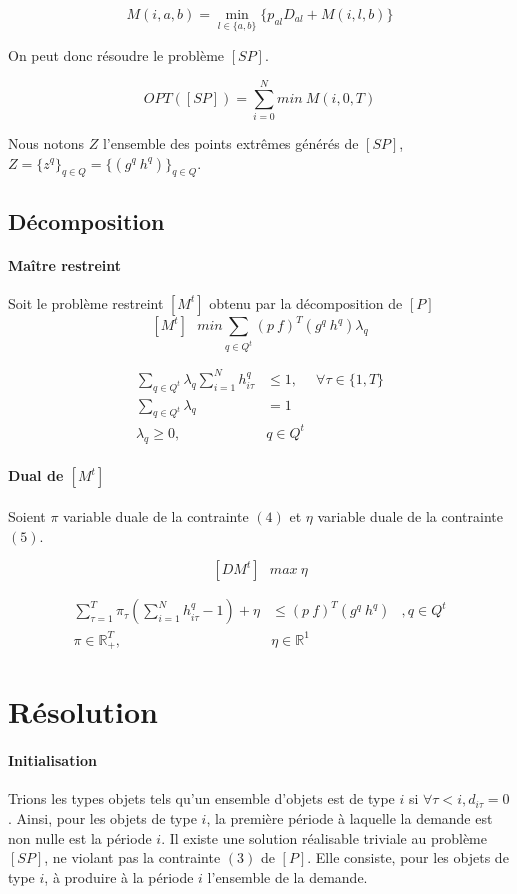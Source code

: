 \documentclass[12pt,a4paper]{article}
\begin{document}
	 $$ M(i,a,b) =  \min_{l \in \{a,b\}} \{ p_{al}D_{al} + M(i,l,b) \} $$
	 
	 On peut donc résoudre le problème $[SP]$.
	 
	 $$ OPT([SP]) = \sum_{i=0}^N min~M(i,0,T) $$
	
	Nous notons $Z$ l'ensemble des points extrêmes générés de $[SP]$, $Z=\{z^q\}_{q\in Q} = \{ (g^q~h^q) \}_{q\in Q}$.
	
\subsection*{Décomposition}
\paragraph{Maître restreint} Soit le problème restreint $[M^t]$ obtenu par la décomposition de $[P]$
 	$$ [M^t] ~~~ min \sum_{q \in Q^t} (p~f)^T(g^q~h^q)\lambda_q $$	
 	
	\begin{eqnarray}	
 		\sum_{q \in Q^t} \lambda_q \sum_{i=1}^N h_{i\tau}^q &\leq 1, & \forall \tau \in \{1,T\} \\
 		\sum_{q \in Q^t} \lambda_q &=1 & \\
 		\lambda_q \geq 0,& q \in Q^t & \nonumber
 	\end{eqnarray}
 	
\newpage 
\paragraph{Dual de $[M^t]$} Soient $\pi$ variable duale de la contrainte $(4)$ et $\eta$ variable duale de la contrainte $(5)$.

$$ [DM^t] ~~~ max ~ \eta $$	

\begin{eqnarray}	
 		\sum_{\tau=1}^T \pi_{\tau} \left( \sum_{i=1}^N h_{i\tau}^q -1 \right) + \eta &\leq (p~f)^T(g^q~h^q)  &, q\in Q^t\\
 		\pi \in \mathbb{R}^T_+,& \eta \in \mathbb{R}^1 \nonumber
 \end{eqnarray}
 	

\section*{Résolution}	

\paragraph{Initialisation} Trions les types objets tels qu'un ensemble d'objets est de type $i$ si $\forall \tau < i , d_{i\tau} = 0$. Ainsi, pour les objets de type $i$, la première période à laquelle la demande est non nulle est la période $i$. \medbreak
 Il existe une solution réalisable triviale au problème $[SP]$, ne violant pas la contrainte $(3)$ de $[P]$. Elle consiste, pour les objets de type $i$, à produire à la période $i$ l'ensemble de la demande.
 
\end{document}
